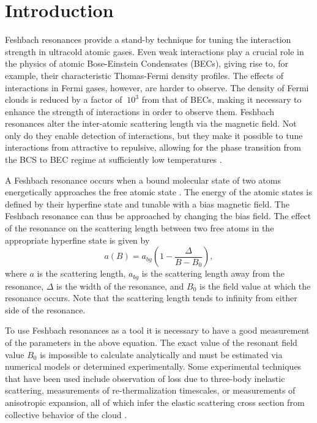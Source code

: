 \documentclass[12pt]{iopart}
\begin{document}
\section{Introduction}
Feshbach resonances provide a stand-by technique for tuning the interaction strength in ultracold atomic gases. Even weak interactions play a crucial role in the physics of atomic Bose-Einstein Condensates (BECs), giving rise to, for example, their characteristic Thomas-Fermi density profiles. The effects of interactions in Fermi gases, however, are harder to observe. The density of Fermi clouds is reduced by a factor of $~10^3$ from that of BECs, making it necessary to enhance the strength of interactions in order to observe them. Feshbach resonances alter the inter-atomic scattering length via the magnetic field. Not only do they enable detection of interactions, but they make it possible to tune interactions from attractive to repulsive, allowing for the phase transition from the BCS to BEC regime at sufficiently low temperatures \cite{RegalThesis}. 
\par A Feshbach resonance occurs when a bound molecular state of two atoms energetically approaches the free atomic state \cite{Chin10}. The energy of the atomic states is defined by their hyperfine state and tunable with a bias magnetic field. The Feshbach resonance can thus be approached by changing the bias field. The effect of the resonance on the scattering length between two free atoms in the appropriate hyperfine state is given by 
\begin{equation}
a(B)=a_{bg}\left(1-\frac{\Delta}{B-B_0}\right),
\label{feshbachEq}
\end{equation}
where $a$ is the scattering length, $a_{bg}$ is the scattering length away from the resonance, $\Delta$ is the width of the resonance, and $B_0$ is the field value at which the resonance occurs. Note that the scattering length tends to infinity from either side of the resonance.
\par To use Feshbach resonances as a tool it  is necessary to have a good measurement of the parameters in the above equation.  The exact value of the resonant field value $B_0$ is impossible to calculate analytically and must be estimated via numerical models or determined experimentally. Some experimental techniques that have been used include observation of loss due to three-body inelastic scattering, measurements of re-thermalization timescales, or measurements of anisotropic expansion, all of which infer the elastic scattering cross section from collective behavior of the cloud \cite{Regal03,OHara02,Monroe93}. 
\end{document}
